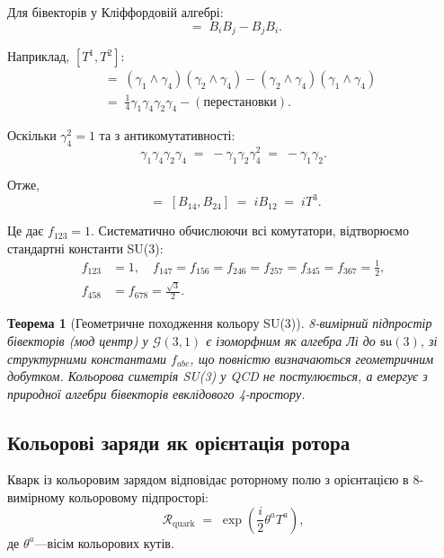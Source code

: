 \documentclass[11pt,a4paper]{article}
\newcommand{\Rotor}{\mathcal{R}}
\newcommand{\Cl}{\mathcal{G}}
\theoremstyle{definition}
\theoremstyle{plain}
\newtheorem{theorem}{Теорема}[section]
\theoremstyle{remark}
\begin{document}
Для бівекторів у Кліффордовій алгебрі:
\begin{equation}
[B_i,B_j] \;=\; B_i B_j - B_j B_i.
\end{equation}

Наприклад, $[T^1,T^2]$:
\begin{align}
[B_{14},B_{24}] &\;=\; (\gamma_1\wedge\gamma_4)(\gamma_2\wedge\gamma_4) - (\gamma_2\wedge\gamma_4)(\gamma_1\wedge\gamma_4) \nonumber \\
&\;=\; \frac{1}{4}\gamma_1\gamma_4\gamma_2\gamma_4 - (\text{перестановки}).
\end{align}

Оскільки $\gamma_4^2=1$ та з антикомутативності:
\begin{equation}
\gamma_1\gamma_4\gamma_2\gamma_4 \;=\; -\gamma_1\gamma_2\gamma_4^2 \;=\; -\gamma_1\gamma_2.
\end{equation}

Отже,
\begin{equation}
[T^1,T^2] \;=\; [B_{14},B_{24}] \;=\; i B_{12} \;=\; i T^3.
\end{equation}

Це дає $f_{123}=1$. Систематично обчислюючи всі комутатори, відтворюємо стандартні константи SU(3):
\begin{align}
f_{123} &= 1, \quad f_{147}=f_{156}=f_{246}=f_{257}=f_{345}=f_{367}=\frac{1}{2}, \nonumber \\
f_{458} &= f_{678} = \frac{\sqrt{3}}{2}.
\label{eq:structure-constants}
\end{align}

\begin{theorem}[Геометричне походження кольору SU(3)]
8-вимірний підпростір бівекторів (мод центр) у $\Cl(3,1)$ є ізоморфним як алгебра Лі до $\mathfrak{su}(3)$, зі структурними константами $f_{abc}$, що повністю визначаються геометричним добутком. Кольорова симетрія SU(3) у QCD не постулюється, а емергує з природної алгебри бівекторів евклідового 4-простору.
\end{theorem}

\subsection{Кольорові заряди як орієнтація ротора}

Кварк із кольоровим зарядом відповідає роторному полю з орієнтацією в 8-вимірному кольоровому підпросторі:
\begin{equation}
\Rotor_{\mathrm{quark}} \;=\; \exp\left(\frac{i}{2}\theta^a T^a\right),
\label{eq:quark-rotor}
\end{equation}
де $\theta^a$—вісім кольорових кутів.
\end{document}
